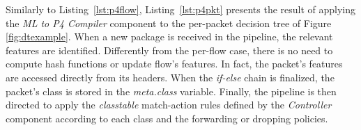 Similarly to Listing~\ref{lst:p4flow}, Listing~\ref{lst:p4pkt} presents the result of applying the \emph{ML to P4 Compiler} component to the per-packet decision tree of Figure \ref{fig:dtexample}.
When a new package is received in the pipeline, the relevant features are identified.
Differently from the per-flow case, there is no need to compute hash functions or update flow's features. In fact, the packet's features are accessed directly from its headers.
When the \emph{if-else} chain is finalized, the packet's class is stored in the \emph{meta.class} variable.
Finally, the pipeline is then directed to apply the \emph{classtable} match-action rules defined by the \emph{Controller} component according to each class and the forwarding or dropping policies.


